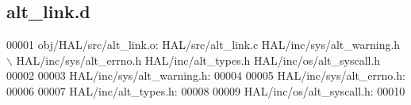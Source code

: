\subsection{alt\+\_\+link.\+d}
\label{alt__link_8d_source}

\begin{DoxyCode}
00001 obj/HAL/src/alt\_link.o: HAL/src/alt\_link.c HAL/inc/sys/alt\_warning.h \(\backslash\)
 HAL/inc/sys/alt_errno.h HAL/inc/alt\_types.h HAL/inc/os/alt\_syscall.h
00002 
00003 HAL/inc/sys/alt\_warning.h:
00004 
00005 HAL/inc/sys/alt_errno.h:
00006 
00007 HAL/inc/alt\_types.h:
00008 
00009 HAL/inc/os/alt\_syscall.h:
00010 \end{DoxyCode}
